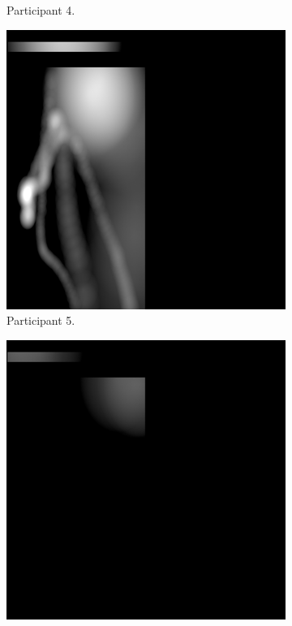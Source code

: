 \begin{figure}[!ht]
\begin{subfigure}[b]{0.24\textwidth}
        \caption{Participant 4.}
    \end{subfigure}
    \hfill
    \begin{subfigure}[b]{0.24\textwidth}
        \centering
        \includegraphics[width=\textwidth]{img/data/Panel11/single/5.png}
        \caption{Participant 5.}
    \end{subfigure}
    \hfill    
    \begin{subfigure}[b]{0.24\textwidth}
        \centering
        \includegraphics[width=\textwidth]{img/data/Panel11/single/6.png}

\end{subfigure}
\end{figure}
